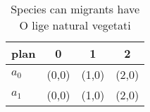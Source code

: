 \documentclass[a4paper]{article}
\begin{document}
\begin{table}
\begin{adjustbox}{width=0.6\columnwidth}
\begin{tabular}{|l|l|l|l|}
\hline
\textbf{plan} & \multicolumn{1}{c|}{\textbf{0}} & \multicolumn{1}{c|}{\textbf{1}} & \multicolumn{1}{c|}{\textbf{2}} \\ \hline
\textbf{$a_0$}  & (0,0) & (1,0) & (2,0) \\ \hline
\textbf{$a_1$}  & (0,0) & (1,0) & (2,0) \\ \hline
\end{tabular}
\end{adjustbox}
\caption{Species can migrants have O lige natural vegetati
}
\end{table}
\end{document}

